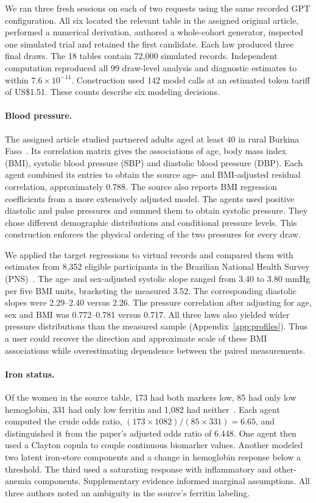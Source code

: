 \documentclass[sigconf,anonymous,review]{acmart}
\begin{document}
We ran three fresh sessions on each of two requests using the same recorded GPT configuration. All six located the relevant table in the assigned original article, performed a numerical derivation, authored a whole-cohort generator, inspected one simulated trial and retained the first candidate. Each law produced three final draws. The 18 tables contain 72,000 simulated records. Independent computation reproduced all 99 draw-level analysis and diagnostic estimates to within $7.6\times10^{-14}$. Construction used 142 model calls at an estimated token tariff of US\$1.51. These counts describe six modeling decisions.

\paragraph{Blood pressure.}
The assigned article studied partnered adults aged at least 40 in rural Burkina Faso~\cite{jaspert}. Its correlation matrix gives the associations of age, body mass index (BMI), systolic blood pressure (SBP) and diastolic blood pressure (DBP). Each agent combined its entries to obtain the source age- and BMI-adjusted residual correlation, approximately 0.788. The source also reports BMI regression coefficients from a more extensively adjusted model. The agents used positive diastolic and pulse pressures and summed them to obtain systolic pressure. They chose different demographic distributions and conditional pressure levels. This construction enforces the physical ordering of the two pressures for every draw.

We applied the target regressions to virtual records and compared them with estimates from 8,352 eligible participants in the Brazilian National Health Survey (PNS)~\cite{pns}. The age- and sex-adjusted systolic slope ranged from 3.40 to 3.80 mmHg per five BMI units, bracketing the measured 3.52. The corresponding diastolic slopes were 2.29--2.40 versus 2.26. The pressure correlation after adjusting for age, sex and BMI was 0.772--0.781 versus 0.717. All three laws also yielded wider pressure distributions than the measured sample (Appendix~\ref{app:profiles}). Thus a user could recover the direction and approximate scale of these BMI associations while overestimating dependence between the paired measurements.

\paragraph{Iron status.}
Of the women in the source table, 173 had both markers low, 85 had only low hemoglobin, 331 had only low ferritin and 1,082 had neither~\cite{zhu}. Each agent computed the crude odds ratio, $(173\times1082)/(85\times331)=6.65$, and distinguished it from the paper's adjusted odds ratio of 6.448. One agent then used a Clayton copula to couple continuous biomarker values. Another modeled two latent iron-store components and a change in hemoglobin response below a threshold. The third used a saturating response with inflammatory and other-anemia components. Supplementary evidence informed marginal assumptions. All three authors noted an ambiguity in the source's ferritin labeling.
\end{document}
